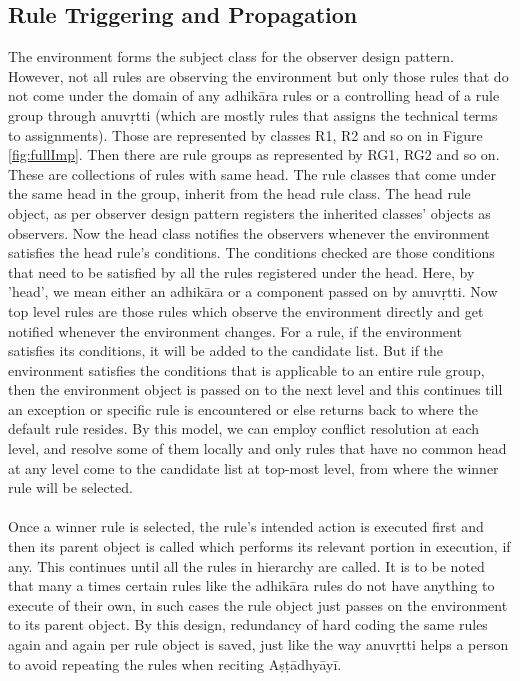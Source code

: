 \documentclass[a4paper,11pt,twoside,openright]{report}
\begin{document}
\subsection{Rule Triggering and Propagation}
The environment forms the subject class for the observer design pattern. However, not all rules are
observing the environment but only those rules that do not come under the domain of any adhikāra rules or a controlling head of a rule group through anuvṛtti (which are mostly rules that assigns the technical terms to assignments). Those are represented by classes R1, R2 and so on in Figure \ref{fig:fullImp}. Then there are rule groups as represented by RG1, RG2 and so on. These are collections of rules with same head. The rule classes that come under the same head in the group, inherit from the head rule class. The head rule object, as per observer design pattern registers the inherited classes' objects as observers. Now the head class notifies the observers whenever the environment satisfies the head rule's conditions. The conditions checked are those conditions that need to be satisfied by all the rules registered under the head.  Here, by 'head', we mean either an adhikāra or a component passed on by anuvṛtti. Now top level rules are those rules which observe the environment directly and get notified whenever the environment changes. For a rule, if the environment satisfies its conditions, it will be added to the candidate list. But if the environment satisfies the conditions that is applicable to an entire rule group, then the environment object is passed on to the next level and this continues till an exception or specific rule is encountered or else returns back to where the default rule resides. By this model, we can employ conflict resolution at each level, and resolve some of them locally and only rules that have no common head at any level come to the candidate list at top-most level, from where the winner rule will be selected.
\\ \\
Once a winner rule is selected, the rule's intended action is executed first and then its parent object is called which performs its relevant portion in execution, if any. This continues until all the rules in hierarchy are called. It is to be noted that many a times certain rules like the adhikāra rules do not have anything to execute of their own, in such cases the rule object just passes on the environment to its parent object. By this design, redundancy of hard coding the same rules again and again per rule object is saved, just like the way anuvṛtti helps a person to avoid repeating the rules when reciting Aṣṭādhyāyī.
\end{document}
